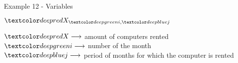 \begin{frame}{Example 12 - Variables}
\begin{center}
\Huge{
$\colora{X}_{\colorb{i}, \colorc{j}}$
}
\end{center}
\large{
$\colora{X} \longrightarrow$
    amount of computers rented \\ \vspace{1cm}
$\colorb{i} \longrightarrow$
    number of the month \\ \vspace{1cm}
$\colorc{j} \longrightarrow$
    period of months for which the computer is rented
}
\end{frame}
